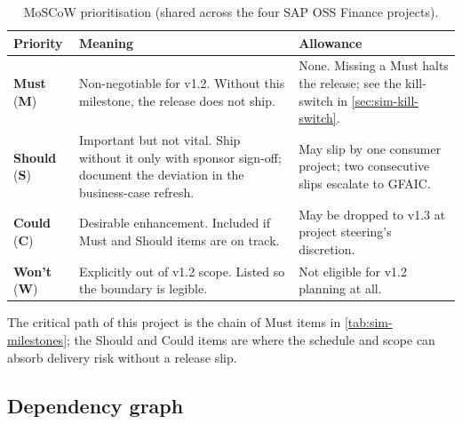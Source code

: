 \begin{table}[htbp]
\centering
\caption{MoSCoW prioritisation (shared across the four SAP OSS Finance
projects).}
\label{tab:sim-moscow}
\footnotesize
\begin{tabularx}{\linewidth}{@{}l l X@{}}
\toprule
\textbf{Priority} & \textbf{Meaning} & \textbf{Allowance} \\ \midrule
\textbf{Must} (\textbf{M}) & Non-negotiable for v1.2. Without this milestone, the release does not ship. & None. Missing a Must halts the release; see the kill-switch in \cref{sec:sim-kill-switch}. \\
\textbf{Should} (\textbf{S}) & Important but not vital. Ship without it only with sponsor sign-off; document the deviation in the business-case refresh. & May slip by one consumer project; two consecutive slips escalate to GFAIC. \\
\textbf{Could} (\textbf{C}) & Desirable enhancement. Included if Must and Should items are on track. & May be dropped to v1.3 at project steering's discretion. \\
\textbf{Won't} (\textbf{W}) & Explicitly out of v1.2 scope. Listed so the boundary is legible. & Not eligible for v1.2 planning at all. \\
\bottomrule
\end{tabularx}
\end{table}

\noindent
The critical path of this project is the chain of Must items in
\cref{tab:sim-milestones}; the Should and Could items are where the
schedule and scope can absorb delivery risk without a release slip.

\subsection{Dependency graph}\label{sec:sim-dependency-graph}

